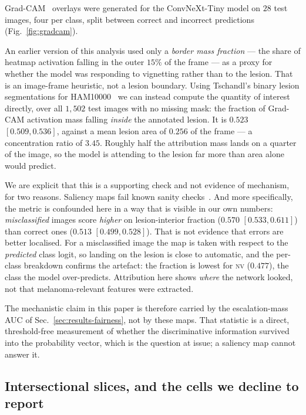 \documentclass[journal]{IEEEtran}
\begin{document}
Grad-CAM~\cite{selvaraju2017gradcam} overlays were generated for the ConvNeXt-Tiny model on
$28$ test images, four per class, split between correct and incorrect predictions
(Fig.~\ref{fig:gradcam}).

An earlier version of this analysis used only a \emph{border mass fraction} --- the share of
heatmap activation falling in the outer $15\%$ of the frame --- as a proxy for whether the
model was responding to vignetting rather than to the lesion. That is an image-frame
heuristic, not a lesion boundary. Using Tschandl's binary lesion segmentations for
HAM10000~\cite{tschandl2020segmentations} we can instead compute the quantity of interest
directly, over all $1{,}502$ test images with no missing mask: the fraction of Grad-CAM
activation mass falling \emph{inside} the annotated lesion. It is $0.523$ $[0.509, 0.536]$,
against a mean lesion area of $0.256$ of the frame --- a concentration ratio of $3.45$. Roughly
half the attribution mass lands on a quarter of the image, so the model is attending to the
lesion far more than area alone would predict.

We are explicit that this is a supporting check and not evidence of mechanism, for two
reasons. Saliency maps fail known sanity checks~\cite{adebayo2018sanity}. And more
specifically, the metric is confounded here in a way that is visible in our own numbers:
\emph{misclassified} images score \emph{higher} on lesion-interior fraction ($0.570$ $[0.533,
0.611]$) than correct ones ($0.513$ $[0.499, 0.528]$). That is not evidence that errors are
better localised. For a misclassified image the map is taken with respect to the
\emph{predicted} class logit, so landing on the lesion is close to automatic, and the
per-class breakdown confirms the artefact: the fraction is lowest for \textsc{nv} ($0.477$),
the class the model over-predicts. Attribution here shows \emph{where} the network looked, not
that melanoma-relevant features were extracted.

The mechanistic claim in this paper is therefore carried by the escalation-mass AUC of
Sec.~\ref{sec:results-fairness}, not by these maps. That statistic is a direct, threshold-free
measurement of whether the discriminative information survived into the probability vector,
which is the question at issue; a saliency map cannot answer it.

\subsection{Intersectional slices, and the cells we decline to report}
\label{sec:results-intersectional}
\end{document}
